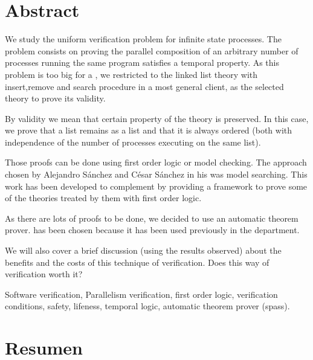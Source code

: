 \chapter*{Abstract}


\begin{abstractEn}

We study the uniform verification problem for infinite state processes. The problem consists on proving the parallel composition of an arbitrary number of processes running the same program satisfies a temporal property. As this problem is too big for a \thisworkm, we restricted to the linked list theory with insert,remove and search procedure in a most general client, as the selected theory to prove its validity. 

By validity we mean that certain property of the theory is preserved. In this case, we prove that a list remains as a list and that it is always ordered (both with independence of the number of processes executing on the same list).


Those proofs can be done using first order logic or model checking. The approach chosen by Alejandro Sánchez and César Sánchez in his  was model searching. This work has been developed to complement  by providing a framework to prove some of the theories treated by them with first order logic. 


As there are lots of proofs to be done, we decided to use an automatic theorem prover.  has been chosen because it has been used previously in the department. 


We will also cover a brief discussion (using the results observed) about the benefits and the costs of this technique of verification. Does this way of verification worth it? 

\end{abstractEn}

\begin{keywordsEn}
Software verification, Parallelism verification, first order logic, verification conditions, safety, lifeness, temporal logic, automatic theorem prover (spass).
\end{keywordsEn}

\chapter*{Resumen}

